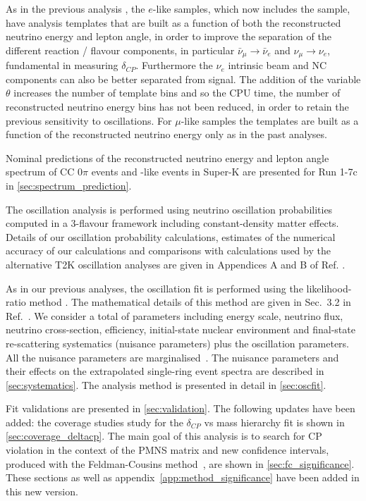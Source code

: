 As in the previous analysis \cite{OurRun1617b17cJointAnalysis3Flavour},
the $e$-like samples, which now includes the \nueCConepi{} sample, have analysis templates that are built as a function of both 
the reconstructed neutrino energy and lepton angle,
in order to improve the separation of the different reaction / flavour components,
in particular $\bar{\nu}_{\mu} \rightarrow \bar{\nu}_e$ and $\nu_{\mu} \rightarrow \nu_e$,
fundamental in measuring $\delta_{CP}$.
Furthermore the $\nu_e$ intrinsic beam and NC components can also be better separated from signal.
The addition of the variable $\theta$ increases the number of template bins and so the CPU time,
the number of reconstructed neutrino energy bins has not been reduced,
in order to retain the previous sensitivity to oscillations.
For $\mu$-like samples the templates are built as a function of the reconstructed neutrino energy only
as in the past analyses.

Nominal predictions of the reconstructed neutrino energy and lepton angle spectrum 
of CC \( 0\pi \) events and \nueCConepi{}-like events in Super-K are presented for Run 1-7c in \cref{sec:spectrum_prediction}.

The oscillation analysis is performed using neutrino oscillation probabilities computed in a 3-flavour
framework including constant-density matter effects. 
Details of our oscillation probability calculations, estimates of the numerical accuracy of our
calculations and comparisons with calculations used by the alternative T2K oscillation analyses 
are given in Appendices A and B of Ref. \cite{OurRun123DisappAnalysis3Flavour}.

As in our previous analyses, the oscillation fit is performed using the likelihood-ratio method \cite{StatAnalysisCowan}.
The mathematical details of this method are given in Sec.\ 3.2 in Ref.\ \cite{OurRun1DisappAnalysis}.
We consider a total of \NSyst{} parameters including energy scale, neutrino flux, neutrino cross-section,
efficiency, initial-state nuclear environment and final-state re-scattering systematics 
(nuisance parameters) plus the oscillation parameters.
All the nuisance parameters are marginalised~\cite{CousinsHighland}.
The nuisance parameters and their effects 
on the extrapolated single-ring event spectra are described in \cref{sec:systematics}.
The analysis method is presented in detail in \cref{sec:oscfit}.


Fit validations are presented in \cref{sec:validation}. 
The following updates have been added: 
the coverage studies study for the $\delta_{CP}$ vs mass hierarchy fit is shown in \cref{sec:coverage_deltacp}.
The main goal of this analysis is to search for CP violation in the context of the PMNS matrix
and new confidence intervals, produced with the Feldman-Cousins method~\cite{FeldmanCousins},
are shown in \cref{sec:fc_significance}.
These sections as well as appendix~\ref{app:method_significance} have been added in this new version.  

